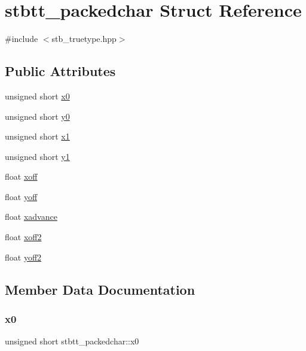 \hypertarget{structstbtt__packedchar}{}\section{stbtt\+\_\+packedchar Struct Reference}
\label{structstbtt__packedchar}


{\ttfamily \#include $<$stb\+\_\+truetype.\+hpp$>$}

\subsection*{Public Attributes}
\begin{DoxyCompactItemize}
\item 
unsigned short \hyperlink{structstbtt__packedchar_a02cb73a5af37ed60dafd5e4b731af09e}{x0}
\item 
unsigned short \hyperlink{structstbtt__packedchar_a43429c9545ca8ccf14012cedcf83c1a7}{y0}
\item 
unsigned short \hyperlink{structstbtt__packedchar_a99d371f0261cd13dfd1a179f143175d1}{x1}
\item 
unsigned short \hyperlink{structstbtt__packedchar_a9569073ba79fad355210b6ffc35905a7}{y1}
\item 
float \hyperlink{structstbtt__packedchar_adb30c50674c79d32116ae6f94bd5893f}{xoff}
\item 
float \hyperlink{structstbtt__packedchar_a6f342ae10df5319f4999ffd256567142}{yoff}
\item 
float \hyperlink{structstbtt__packedchar_a28707ae98d1fa946b3390840aeff76ab}{xadvance}
\item 
float \hyperlink{structstbtt__packedchar_a3a33880f925ca826c908cbf9f0673c9f}{xoff2}
\item 
float \hyperlink{structstbtt__packedchar_a2ec5bbd1010c9a9b7cbdeb7503dcaffa}{yoff2}
\end{DoxyCompactItemize}


\subsection{Member Data Documentation}
\hypertarget{structstbtt__packedchar_a02cb73a5af37ed60dafd5e4b731af09e}{}\label{structstbtt__packedchar_a02cb73a5af37ed60dafd5e4b731af09e} 
\subsubsection{\texorpdfstring{x0}{x0}}
{\footnotesize\ttfamily unsigned short stbtt\+\_\+packedchar\+::x0}

